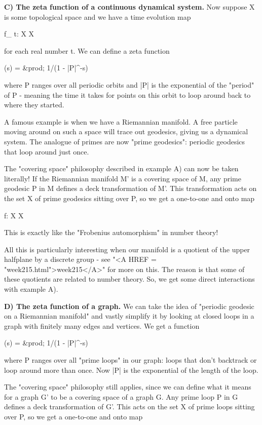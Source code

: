 \textbf{C) The zeta function of a continuous dynamical system.}  
Now suppose X is some topological space and we have a time
evolution map

f_{ t}: X \to  X

for each real number t.  We can define a zeta function

\zeta (s) = &prod;   1/(1 - |P|^{-s})

where P ranges over all periodic orbits and |P| is the 
exponential of the "period" of P - meaning the time it takes 
for points on this orbit to loop around back to where they started.

A famous example is when we have a Riemannian manifold.  A free particle 
moving around on such a space will trace out geodesics, giving us a 
dynamical system.  The analogue of primes are now "prime geodesics": 
periodic geodesics that loop around just once.

The "covering space" philosophy described in example A) can now be 
taken literally!  If the Riemannian manifold M' is a covering 
space of M, any prime geodesic P in M defines a deck transformation 
of M'.  This transformation acts on the set X of prime geodesics 
sitting over P, so we get a one-to-one and onto map

f: X \to  X

This is exactly like the "Frobenius automorphism" in number theory!

All this is particularly interesting when our manifold is a quotient 
of the upper halfplane by a discrete group - see "<A HREF = "week215.html">week215</A>" for more
on this.  The reason is that some of these quotients are related to 
number theory.   So, we get some direct interactions with example A).

\textbf{D) The zeta function of a graph.}  We can take the idea of
"periodic geodesic on a Riemannian manifold" and vastly simplify
it by looking at closed loops in a graph with finitely many 
edges and vertices.  We get a \zeta  function

\zeta (s) = &prod;   1/(1 - |P|^{-s})

where P ranges over all "prime loops" in our graph: loops that don't 
backtrack or loop around more than once.  Now |P| is the exponential 
of the length of the loop.

The "covering space" philosophy still applies, since we can define 
what it means for a graph G' to be a covering space of a graph G.  
Any prime loop P in G defines a deck transformation of G'.  This 
acts on the set X of prime loops sitting over P, so we get a
one-to-one and onto map

